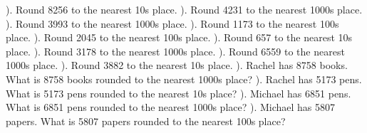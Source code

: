 \documentclass{article}%
\begin{document}
\newline%
\newline%
). Round 8256 to the nearest 10s place.%
\newline%
\newline%
). Round 4231 to the nearest 1000s place.%
\newline%
\newline%
). Round 3993 to the nearest 1000s place.%
\newline%
\newline%
). Round 1173 to the nearest 100s place.%
\newline%
\newline%
). Round 2045 to the nearest 100s place.%
\newline%
\newline%
). Round 657 to the nearest 10s place.%
\newline%
\newline%
). Round 3178 to the nearest 1000s place.%
\newline%
\newline%
). Round 6559 to the nearest 1000s place.%
\newline%
\newline%
). Round 3882 to the nearest 10s place.%
\newline%
\newline%
). Rachel has 8758 books. What is 8758 books rounded to the nearest 1000s place?%
\newline%
\newline%
). Rachel has 5173 pens. What is 5173 pens rounded to the nearest 10s place?%
\newline%
\newline%
). Michael has 6851 pens. What is 6851 pens rounded to the nearest 1000s place?%
\newline%
\newline%
). Michael has 5807 papers. What is 5807 papers rounded to the nearest 100s place?%
\end{document}
